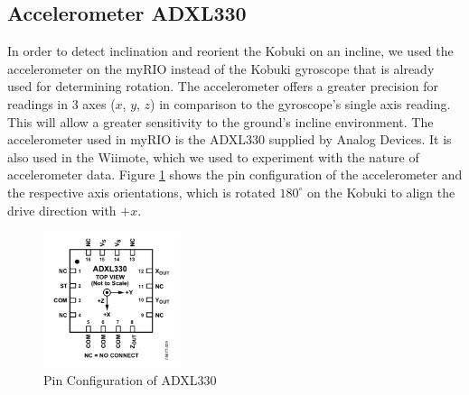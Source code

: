 \subsection{Accelerometer ADXL330} \label{sec:acc}
\vspace{-0.2cm} In order to detect inclination and reorient the Kobuki on an incline, we used the accelerometer on the myRIO instead of the Kobuki gyroscope that is already used for determining rotation. The accelerometer offers a greater precision for readings in 3 axes ($x$, $y$, $z$) in comparison to the gyroscope's single axis reading. This will allow a greater sensitivity to the ground's incline environment. The accelerometer used in myRIO is the ADXL330 supplied by Analog Devices. It is also used in the Wiimote, which we used to experiment with the nature of accelerometer data. Figure \ref{fig:ADXL330} shows the pin configuration of the accelerometer and the respective axis orientations, which is rotated $180^\circ$ on the Kobuki to align the drive direction with $+x$.
\begin{figure}[H]
    \centering
    \includegraphics[width=4cm]{Images/ADXL330.png}
    \caption{Pin Configuration of ADXL330 \cite{ADXL330}}
    \label{fig:ADXL330}
\end{figure}

